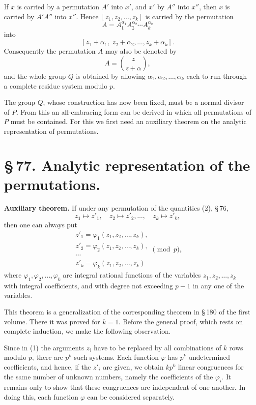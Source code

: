 \documentclass[11pt]{article}
\begin{document}
If $x$ is carried by a permutation $A'$ into $x'$, and $x'$ by $A''$ into $x''$, then $x$ is carried by $A'A''$ into $x''$. Hence $[z_1,z_2,\ldots,z_k]$ is carried by the permutation
\begin{equation}
 A=A_1^{\alpha_1}A_2^{\alpha_2}\cdots A_k^{\alpha_k}
 \tag{3}
\end{equation}
into
\[
 [z_1+\alpha_1,\;z_2+\alpha_2,\ldots,z_k+\alpha_k].
\]
Consequently the permutation $A$ may also be denoted by
\begin{equation}
 A=\binom{z}{z+\alpha},
 \tag{4}
\end{equation}
and the whole group $Q$ is obtained by allowing $\alpha_1,\alpha_2,\ldots,\alpha_k$ each to run through a complete residue system modulo $p$.

The group $Q$, whose construction has now been fixed, must be a normal divisor of $P$. From this an all-embracing form can be derived in which all permutations of $P$ must be contained. For this we first need an auxiliary theorem on the analytic representation of permutations.

\section*{\S\,77. Analytic representation of the permutations.}

\textbf{Auxiliary theorem.} If under any permutation of the quantities (2), \S\,76,
\[
 z_1\mapsto z'_1,\quad z_2\mapsto z'_2,\ldots,\quad z_k\mapsto z'_k,
\]
then one can always put
\begin{equation}
\begin{gathered}
 z'_1=\varphi_1(z_1,z_2,\ldots,z_k),\\
 z'_2=\varphi_2(z_1,z_2,\ldots,z_k),\\
 \cdots\\
 z'_k=\varphi_k(z_1,z_2,\ldots,z_k)
\end{gathered}
 \pmod p,
 \tag{1}
\end{equation}
where $\varphi_1,\varphi_2,\ldots,\varphi_k$ are integral rational functions of the variables $z_1,z_2,\ldots,z_k$ with integral coefficients, and with degree not exceeding $p-1$ in any one of the variables.

This theorem is a generalization of the corresponding theorem in \S\,180 of the first volume. There it was proved for $k=1$. Before the general proof, which rests on complete induction, we make the following observation.

Since in (1) the arguments $z_i$ have to be replaced by all combinations of $k$ rows modulo $p$, there are $p^k$ such systems. Each function $\varphi$ has $p^k$ undetermined coefficients, and hence, if the $z'_i$ are given, we obtain $kp^k$ linear congruences for the same number of unknown numbers, namely the coefficients of the $\varphi_i$. It remains only to show that these congruences are independent of one another. In doing this, each function $\varphi$ can be considered separately.
\end{document}
